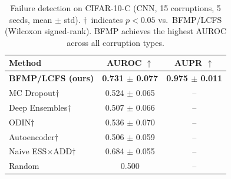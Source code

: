 \begin{table}[t]
\centering
\caption{Failure detection on CIFAR-10-C (CNN, 15 corruptions, 5 seeds, mean $\pm$ std). $\dagger$~indicates $p < 0.05$ vs.\ BFMP/LCFS (Wilcoxon signed-rank). BFMP achieves the highest AUROC across all corruption types.}
\label{tab:main_results}
\begin{tabular}{lcc}
\toprule
Method & AUROC $\uparrow$ & AUPR $\uparrow$ \\
\midrule
\textbf{BFMP/LCFS (ours)} & \textbf{0.731 $\pm$ 0.077} & \textbf{0.975 $\pm$ 0.011} \\
MC Dropout$\dagger$ & 0.524 $\pm$ 0.065 & -- \\
Deep Ensembles$\dagger$ & 0.507 $\pm$ 0.066 & -- \\
ODIN$\dagger$ & 0.536 $\pm$ 0.070 & -- \\
Autoencoder$\dagger$ & 0.506 $\pm$ 0.059 & -- \\
Naive ESS$\times$ADD$\dagger$ & 0.684 $\pm$ 0.055 & -- \\
\midrule
Random & 0.500 & -- \\
\bottomrule
\end{tabular}
\end{table}